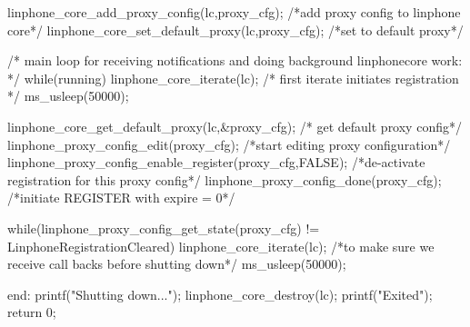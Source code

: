 \begin{DoxyCodeInclude}
{                linphone_core_add_proxy_config(lc,proxy_cfg); /*add proxy
       config to linphone core*/
                linphone_core_set_default_proxy(lc,proxy_cfg); /*set to default
       proxy*/


        /* main loop for receiving notifications and doing background
       linphonecore work: */
        while(running){
                linphone_core_iterate(lc); /* first iterate initiates
       registration */
                ms_usleep(50000);
        }

        linphone_core_get_default_proxy(lc,&proxy_cfg); /* get default proxy
       config*/
        linphone_proxy_config_edit(proxy_cfg); /*start editing proxy
       configuration*/
        linphone_proxy_config_enable_register(proxy_cfg,FALSE); /*de-activate
       registration for this proxy config*/
        linphone_proxy_config_done(proxy_cfg); /*initiate REGISTER with expire
       = 0*/

        while(linphone_proxy_config_get_state(proxy_cfg) !=  
      LinphoneRegistrationCleared){
                linphone_core_iterate(lc); /*to make sure we receive call backs
       before shutting down*/
                ms_usleep(50000);
        }

end:
        printf("Shutting down...\n");
        linphone_core_destroy(lc);
        printf("Exited\n");
        return 0;
}

\end{DoxyCodeInclude}
 